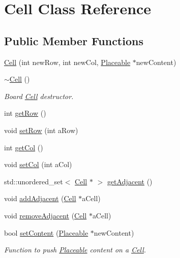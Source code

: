 \hypertarget{class_cell}{}\section{Cell Class Reference}
\label{class_cell}
\subsection*{Public Member Functions}
\begin{DoxyCompactItemize}
\item 
\hyperlink{class_cell_a3c614b825bdf6a24d4a3e2e52b310568}{Cell} (int new\+Row, int new\+Col, \hyperlink{class_placeable}{Placeable} $\ast$new\+Content)
\item 
\hypertarget{class_cell_a9fa559f7a28e2b4336c6879ca09304d8}{}\label{class_cell_a9fa559f7a28e2b4336c6879ca09304d8} 
\hyperlink{class_cell_a9fa559f7a28e2b4336c6879ca09304d8}{$\sim$\+Cell} ()
\begin{DoxyCompactList}\small\item\em Board \hyperlink{class_cell}{Cell} destructor. \end{DoxyCompactList}\item 
int \hyperlink{class_cell_a6665d7f040a6a7b140e8d27c608a421e}{get\+Row} ()
\item 
void \hyperlink{class_cell_abe20d88439c8e1482a207fc1d627d00e}{set\+Row} (int a\+Row)
\item 
int \hyperlink{class_cell_ace419ef9ac6690bab2dd554d8b9f0d2f}{get\+Col} ()
\item 
void \hyperlink{class_cell_a1985a73d12e0e439ec05317e220cafee}{set\+Col} (int a\+Col)
\item 
std\+::unordered\+\_\+set$<$ \hyperlink{class_cell}{Cell} $\ast$ $>$ \hyperlink{class_cell_a9912ab381441093706286584eff721fa}{get\+Adjacent} ()
\item 
void \hyperlink{class_cell_a90d2e75867bd5f2b553dec1498fdf4e6}{add\+Adjacent} (\hyperlink{class_cell}{Cell} $\ast$a\+Cell)
\item 
void \hyperlink{class_cell_a5d9bda81ac204c982b084c7b02f4d6de}{remove\+Adjacent} (\hyperlink{class_cell}{Cell} $\ast$a\+Cell)
\item 
\hypertarget{class_cell_add026562137122494104071baa175473}{}\label{class_cell_add026562137122494104071baa175473} 
bool \hyperlink{class_cell_add026562137122494104071baa175473}{set\+Content} (\hyperlink{class_placeable}{Placeable} $\ast$new\+Content)
\begin{DoxyCompactList}\small\item\em Function to push \hyperlink{class_placeable}{Placeable} content on a \hyperlink{class_cell}{Cell}. \end{DoxyCompactList}\item 

\end{DoxyCompactItemize}
